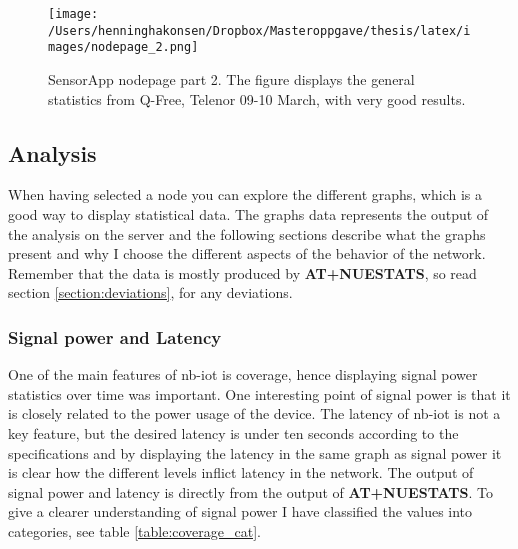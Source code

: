 \documentclass[USenglish]{ifimaster}  %
\begin{document}
\begin{figure}[H]
  \centering
  \texttt{[image: /Users/henninghakonsen/Dropbox/Masteroppgave/thesis/latex/images/nodepage\_2.png]}
  \caption[SensorApp nodepage part 2]{SensorApp nodepage part 2. The figure displays the general statistics from Q-Free, Telenor 09-10 March, with very good results.}
  \label{pic:nodepage2}
\end{figure}

\subsection{Analysis} \label{ssection:analysis}
When having selected a node you can explore the different graphs, which is a good way to display statistical data. The graphs data represents the output of the analysis on the server and the following sections describe what the graphs present and why I choose the different aspects of the behavior of the network. Remember that the data is mostly produced by \textbf{AT+NUESTATS}, so read section \vref{section:deviations}, for any deviations.

\subsubsection{Signal power and Latency}
One of the main features of \acrshort{nb-iot} is coverage, hence displaying signal power statistics over time was important. One interesting point of signal power is that it is closely related to the power usage of the device. The latency of \acrshort{nb-iot} is not a key feature, but the desired latency is under ten seconds according to the specifications\cite{datasheet:ubloxchip} and by displaying the latency in the same graph as signal power it is clear how the different levels inflict latency in the network. The output of signal power and latency is directly from the output of \textbf{AT+NUESTATS}. To give a clearer understanding of signal power I have classified the values into categories, see table \vref{table:coverage_cat}.

\begin{table}[H]
\centering
{}
\caption{Signal power categories}
\label{table:coverage_cat}
\end{table}
\end{document}
